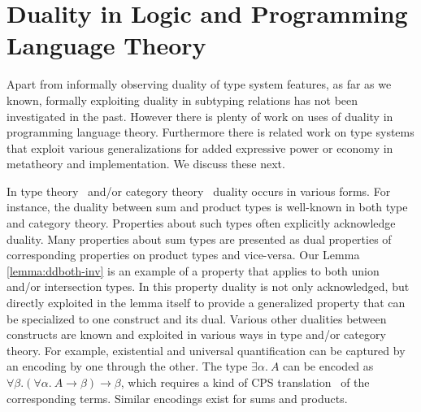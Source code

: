 






\section{Duality in Logic and Programming Language Theory}

Apart from informally observing duality of type system features, as far as we known,
formally exploiting duality in subtyping relations has not been investigated in the past.
However there is plenty of work on uses of duality in programming language theory.
Furthermore there is related work on type
systems that exploit various generalizations for added expressive
power or economy in metatheory and implementation. We discuss these next.

In type theory~\citep{Andrews86} and/or category theory~\citep{MacLane:cwm,BirddeMoor96:Algebra}
duality occurs in various forms. For instance,
the duality between sum and product types is well-known in both type and
category theory. Properties about such types often explicitly acknowledge
duality. Many properties about sum types are presented as 
dual properties of corresponding properties on product types and vice-versa. Our Lemma \ref{lemma:ddboth-inv}
is an example of a property that applies to both union and/or intersection types.
In this property duality is not only acknowledged, but directly exploited in the lemma
itself to provide a generalized property that can be specialized
to one construct and its dual.
Various other dualities between constructs are known and exploited in various
ways in type and/or category theory.
For example, existential and universal quantification can be captured by an
encoding by one through the other. The type $\exists \alpha.~A$ can
be encoded as $\forall \beta. (\forall \alpha.~A \to \beta) \to \beta$, which
requires a kind of CPS translation~\citep{DaFi1992} of the corresponding terms. Similar
encodings exist for sums and products.

